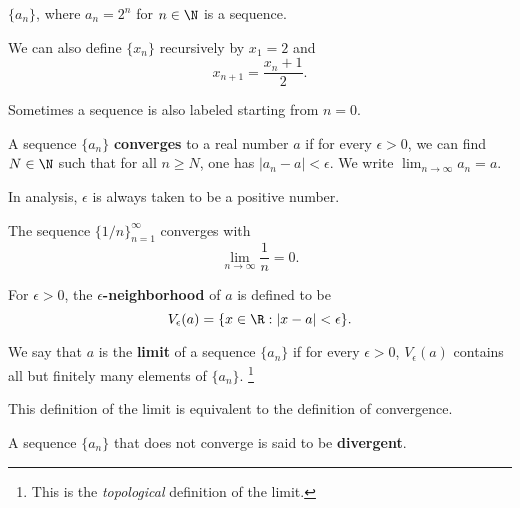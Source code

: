 \begin{example}
  $\{a_n\}$, where $a_n = 2^n$ for $n \in \N$ is a sequence.
\end{example}

\begin{example}
  We can also define $\{x_n\}$ recursively by $x_1 = 2$
  and
  \[
    x_{n+1} = \frac{x_n + 1}{2}
  .\]
\end{example}

\begin{remark}
  Sometimes a sequence is also labeled starting from
  $n = 0$.
\end{remark}

\begin{definition}
  A sequence $\{a_n\}$ \textbf{converges} to a real number
  $a$ if for every $\epsilon > 0$, we can find $N \in \N$
  such that for all $n \ge N$, one has
  $|a_n - a| < \epsilon$.
  We write $\lim_{n \to \infty} a_n = a$.
\end{definition}

\begin{remark}
  In analysis, $\epsilon$ is always taken to be a
  positive number.
\end{remark}

\begin{example}
  The sequence $\{1/n\}_{n = 1}^\infty$ converges with
  \[\lim_{n \to \infty} \frac{1}{n} = 0.\]
\end{example}

\begin{definition}
  For $\epsilon > 0$, the
  \textbf{$\epsilon$-neighborhood} of $a$
  is defined to be
  \[V_\epsilon(a) = \{x \in \R : |x - a| < \epsilon\}.\]
\end{definition}

\begin{definition}
  We say that $a$ is the \textbf{limit} of a sequence
  $\{a_n\}$ if for every $\epsilon > 0$,
  $V_\epsilon(a)$ contains all but finitely
  many elements of $\{a_n\}$.
  \footnote{This is the \textit{topological} definition
    of the limit.}
\end{definition}

\begin{remark}
  This definition of the limit is equivalent to the
  definition of convergence.
\end{remark}

\begin{definition}
  A sequence $\{a_n\}$ that does not converge is said
  to be \textbf{divergent}.
\end{definition}

